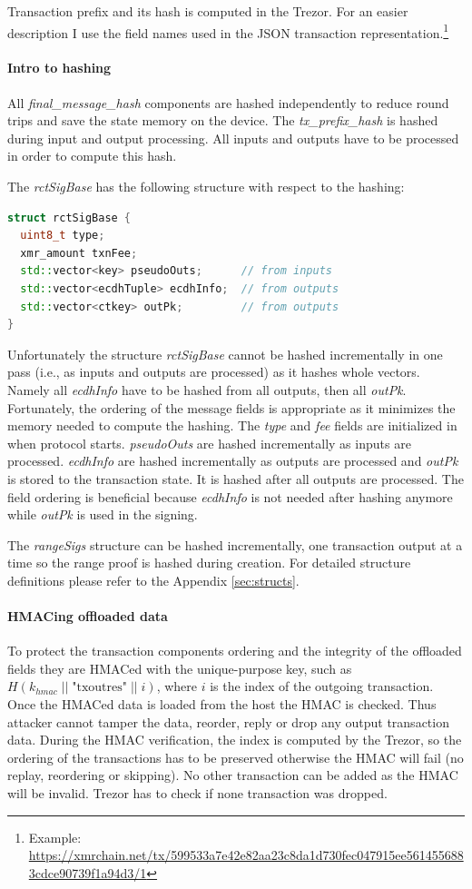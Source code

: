 \documentclass[]{article}
\begin{document}
Transaction prefix and its hash is computed in the Trezor.
For an easier description I use the field names used in the JSON transaction representation.\footnote{Example: \url{https://xmrchain.net/tx/599533a7e42e82aa23c8da1d730fec047915ee5614556883cdce90739f1a94d3/1}}

\paragraph{Intro to hashing}
All \emph{final\_message\_hash} components are hashed independently to reduce round trips and save the state memory on the device.
The \emph{tx\_prefix\_hash} is hashed during input and output processing. All inputs and outputs have to be processed in order to compute this hash.

The \emph{rctSigBase} has the following structure with respect to the hashing:  
\begin{lstlisting}[language=c++]
struct rctSigBase {
  uint8_t type;
  xmr_amount txnFee;
  std::vector<key> pseudoOuts;      // from inputs
  std::vector<ecdhTuple> ecdhInfo;  // from outputs
  std::vector<ctkey> outPk;         // from outputs
}
\end{lstlisting}

Unfortunately the structure \emph{rctSigBase} cannot be hashed incrementally in one pass (i.e., as inputs and outputs are processed) as it hashes whole vectors. Namely all \emph{ecdhInfo} have to be hashed from all outputs, then all \emph{outPk}. Fortunately, the ordering of the message fields is appropriate as it minimizes the memory needed to compute the hashing. The \emph{type} and \emph{fee} fields are initialized in when protocol starts. \emph{pseudoOuts} are hashed incrementally as inputs are processed. \emph{ecdhInfo} are hashed incrementally as outputs are processed and \emph{outPk} is stored to the transaction state. It is hashed after all outputs are processed. The field ordering is beneficial because \emph{ecdhInfo} is not needed after hashing anymore while \emph{outPk} is used in the signing.

The \emph{rangeSigs} structure can be hashed incrementally, one transaction output at a time so the range proof is hashed during creation.
For detailed structure definitions please refer to the Appendix \ref{sec:structs}. 

\paragraph{HMACing offloaded data}
To protect the transaction components ordering and the integrity of the offloaded fields they are HMACed with the unique-purpose key, such as $H(k_{hmac} \; || \; \text{"txoutres"} \; || \; i)$, where $i$ is the index of the outgoing transaction. Once the HMACed data is loaded from the host the HMAC is checked. Thus attacker cannot tamper the data, reorder, reply or drop any output transaction data. During the HMAC verification, the index is computed by the Trezor, so the ordering of the transactions has to be preserved otherwise the HMAC will fail (no replay, reordering or skipping). No other transaction can be added as the HMAC will be invalid. Trezor has to check if none transaction was dropped.
\end{document}
